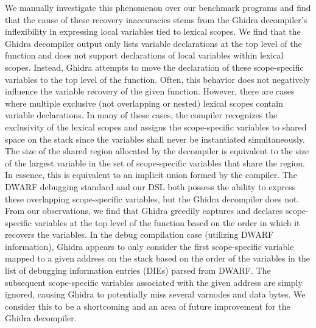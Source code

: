 We manually investigate this phenomenon over our benchmark programs and find that the cause of these recovery inaccuracies stems from the Ghidra decompiler's inflexibility in expressing local variables tied to lexical scopes. We find that the Ghidra decompiler output only lists variable declarations at the top level of the function and does not support declarations of local variables within lexical scopes. Instead, Ghidra attempts to move the declaration of these scope-specific variables to the top level of the function. Often, this behavior does not negatively influence the variable recovery of the given function. However, there are cases where multiple exclusive (not overlapping or nested) lexical scopes contain variable declarations. In many of these cases, the compiler recognizes the exclusivity of the lexical scopes and assigns the scope-specific variables to shared space on the stack since the variables shall never be instantiated simultaneously. The size of the shared region allocated by the decompiler is equivalent to the size of the largest variable in the set of scope-specific variables that share the region. In essence, this is equivalent to an implicit union formed by the compiler. The DWARF debugging standard and our DSL both possess the ability to express these overlapping scope-specific variables, but the Ghidra decompiler does not. From our observations, we find that Ghidra greedily captures and declares scope-specific variables at the top level of the function based on the order in which it recovers the variables. In the debug compilation case (utilizing DWARF information), Ghidra appears to only consider the first scope-specific variable mapped to a given address on the stack based on the order of the variables in the list of debugging information entries (DIEs) parsed from DWARF. The subsequent scope-specific variables associated with the given address are simply ignored, causing Ghidra to potentially miss several varnodes and data bytes. We consider this to be a shortcoming and an area of future improvement for the Ghidra decompiler.

